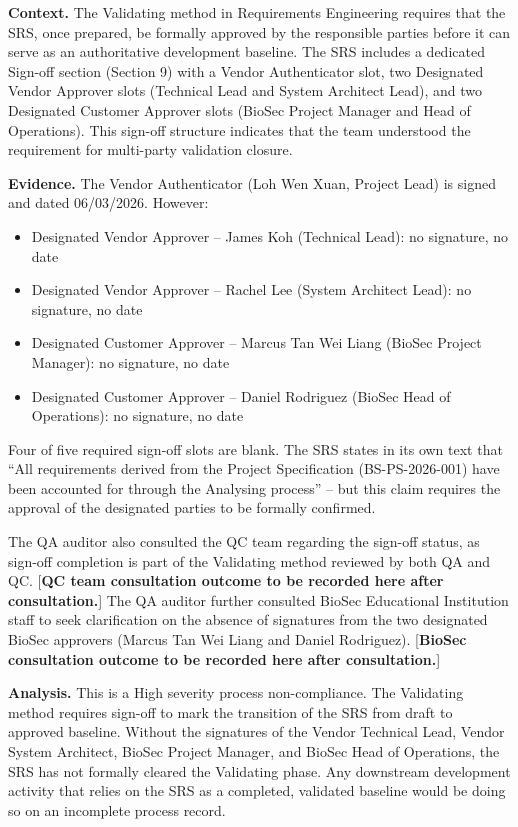 \documentclass[11pt,a4paper]{article}
\begin{document}
\textbf{Context.}
The Validating method in Requirements Engineering requires that the SRS, once prepared, be formally approved by the responsible parties before it can serve as an authoritative development baseline. The SRS includes a dedicated Sign-off section (Section 9) with a Vendor Authenticator slot, two Designated Vendor Approver slots (Technical Lead and System Architect Lead), and two Designated Customer Approver slots (BioSec Project Manager and Head of Operations). This sign-off structure indicates that the team understood the requirement for multi-party validation closure.

\textbf{Evidence.}
The Vendor Authenticator (Loh Wen Xuan, Project Lead) is signed and dated 06/03/2026. However:
\begin{itemize}[leftmargin=*]
\item Designated Vendor Approver -- James Koh (Technical Lead): no signature, no date
\item Designated Vendor Approver -- Rachel Lee (System Architect Lead): no signature, no date
\item Designated Customer Approver -- Marcus Tan Wei Liang (BioSec Project Manager): no signature, no date
\item Designated Customer Approver -- Daniel Rodriguez (BioSec Head of Operations): no signature, no date
\end{itemize}

Four of five required sign-off slots are blank. The SRS states in its own text that ``All requirements derived from the Project Specification (BS-PS-2026-001) have been accounted for through the Analysing process'' -- but this claim requires the approval of the designated parties to be formally confirmed.

The QA auditor also consulted the QC team regarding the sign-off status, as sign-off completion is part of the Validating method reviewed by both QA and QC. [\textbf{QC team consultation outcome to be recorded here after consultation.}] The QA auditor further consulted BioSec Educational Institution staff to seek clarification on the absence of signatures from the two designated BioSec approvers (Marcus Tan Wei Liang and Daniel Rodriguez). [\textbf{BioSec consultation outcome to be recorded here after consultation.}]

\textbf{Analysis.}
This is a High severity process non-compliance. The Validating method requires sign-off to mark the transition of the SRS from draft to approved baseline. Without the signatures of the Vendor Technical Lead, Vendor System Architect, BioSec Project Manager, and BioSec Head of Operations, the SRS has not formally cleared the Validating phase. Any downstream development activity that relies on the SRS as a completed, validated baseline would be doing so on an incomplete process record.
\end{document}

